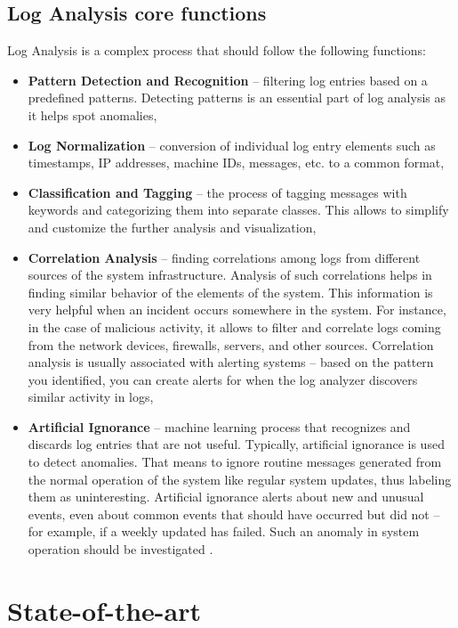 \documentclass[thesis=M,english]{FITthesis}[2019/12/23]
\begin{document}
\section{Log Analysis core functions}
Log Analysis is a complex process that should follow the following functions:
\begin{itemize}
	\item \textbf{Pattern Detection and Recognition} -- filtering log entries based on a predefined patterns. Detecting patterns is an essential part of log analysis as it helps spot anomalies,
	\item \textbf{Log Normalization} -- conversion of individual log entry elements such as timestamps, IP addresses, machine IDs, messages, etc. to a common format,
	\item \textbf{Classification and Tagging} -- the process of tagging messages with keywords and categorizing them into separate classes. This allows to simplify and customize the further analysis and visualization,
	\item \textbf{Correlation Analysis} -- finding correlations among logs from different sources of the system infrastructure. Analysis of such correlations helps in finding similar behavior of the elements of the system. This information is very helpful when an incident occurs somewhere in the system. For instance, in the case of malicious activity, it allows to filter and correlate logs coming from the network devices, firewalls, servers, and other sources. Correlation analysis is usually associated with alerting systems – based on the pattern you identified, you can create alerts for when the log analyzer discovers similar activity in logs,
	\item \textbf{Artificial Ignorance} -- machine learning process that recognizes and discards log entries that are not useful. Typically, artificial ignorance is used to detect anomalies. That means to ignore routine messages generated from the normal operation of the system like regular system updates, thus labeling them as uninteresting. Artificial ignorance alerts about new and unusual events, even about common events that should have occurred but did not – for example, if a weekly updated has failed. Such an anomaly in system operation should be investigated \cite{sematext, xplg-site}.
\end{itemize}

\chapter{State-of-the-art}
\end{document}
